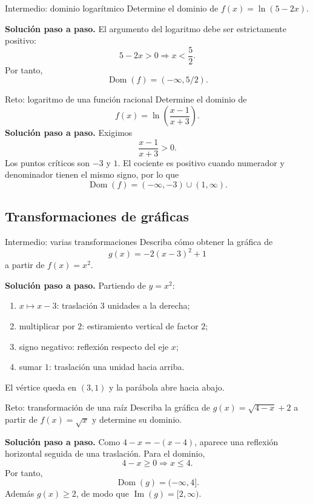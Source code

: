 \documentclass[aspectratio=169,10pt]{beamer}
\newcommand{\Dom}{\operatorname{Dom}}
\newcommand{\Ima}{\operatorname{Im}}
\begin{document}
\begin{frame}{Intermedio: dominio logarítmico}
Determine el dominio de $f(x)=\ln(5-2x)$.

\textbf{Solución paso a paso.} El argumento del logaritmo debe ser estrictamente positivo:
\[
5-2x>0\Longrightarrow x<\frac52.
\]
Por tanto,
\[
\boxed{\Dom(f)=(-\infty,5/2)}.
\]
\end{frame}

\begin{frame}{Reto: logaritmo de una función racional}
Determine el dominio de
\[
f(x)=\ln\left(\frac{x-1}{x+3}\right).
\]
\textbf{Solución paso a paso.} Exigimos
\[
\frac{x-1}{x+3}>0.
\]
Los puntos críticos son $-3$ y $1$. El cociente es positivo cuando numerador y denominador tienen el mismo signo, por lo que
\[
\boxed{\Dom(f)=(-\infty,-3)\cup(1,\infty)}.
\]
\end{frame}

\subsection{Transformaciones de gráficas}

\begin{frame}{Intermedio: varias transformaciones}
Describa cómo obtener la gráfica de
\[
g(x)=-2(x-3)^2+1
\]
a partir de $f(x)=x^2$.

\textbf{Solución paso a paso.} Partiendo de $y=x^2$:
\begin{enumerate}
\item $x\mapsto x-3$: traslación $3$ unidades a la derecha;
\item multiplicar por $2$: estiramiento vertical de factor $2$;
\item signo negativo: reflexión respecto del eje $x$;
\item sumar $1$: traslación una unidad hacia arriba.
\end{enumerate}
El vértice queda en $(3,1)$ y la parábola abre hacia abajo.
\end{frame}

\begin{frame}{Reto: transformación de una raíz}
Describa la gráfica de $g(x)=\sqrt{4-x}+2$ a partir de $f(x)=\sqrt{x}$ y determine su dominio.

\textbf{Solución paso a paso.} Como $4-x=-(x-4)$, aparece una reflexión horizontal seguida de una traslación. Para el dominio,
\[
4-x\ge0\Longrightarrow x\le4.
\]
Por tanto,
\[
\boxed{\Dom(g)=(-\infty,4]}.
\]
Además $g(x)\ge2$, de modo que $\Ima(g)=[2,\infty)$.
\end{frame}
\end{document}
